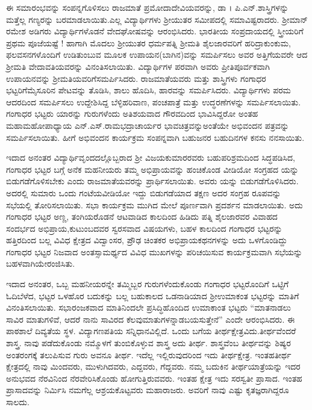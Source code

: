 {ಈ ಸಮಾರಂಭವನ್ನು ಸಂಪನ್ನಗೊಳಿಸಲು ರಾಜಮಾತೆ ಪ್ರಮೋದಾದೇವಿಯವ\-ರನ್ನು, ಡಾ । ಪಿ.ಎನ್.ಶಾಸ್ತ್ರಿಗಳನ್ನು ಮತ್ತೆಲ್ಲ ಗಣ್ಯರನ್ನು ಬರಮಾಡಲಾಯಿತು.ಎಲ್ಲ ವಿದ್ಯಾರ್ಥಿಗಳು ಶ್ರೀಯುತರ ಸಮೀಪದಲ್ಲಿ ಸಮಾವಿಷ್ಟರಾದರು. ಶ್ರೀಮಾನ್ ರಮೇಶ ಅಡಿಗರು ವಿದ್ಯಾರ್ಥಿಗಳೊಡನೆ ವೇದಘೋಷವನ್ನು ಆರಂಭಿಸಿದರು. ಭಾರತೀಯ ಸಂಪ್ರದಾಯದಲ್ಲಿ ಸ್ತ್ರೀಯರಿಗೆ ಪ್ರಥಮ ಪೂಜೆಯಷ್ಟೆ ! ಹಾಗಾಗಿ ಮೊದಲು ಶ್ರೀಯುತರ ಧರ್ಮಪತ್ನಿ ಶ್ರೀಮತಿ ಶೈಲಜಾರವರಿಗೆ  ಹರಿದ್ರಾಕುಂಕುಮ, ಫಲವಸನಗಳೊಂದಿಗೆ ಉಡಿತುಂಬುವ ಮೂಲಕ ಉಪಾಯನ(ಬಾಗಿನ)ವನ್ನು ಸಮರ್ಪಿಸಲು ಅವರ ಅತ್ತಿಗೆಯವರೇ ಆದ  ಶ್ರೀಮತಿ ವೇದಾವತಿಯವರನ್ನು ವಿನಂತಿಸಲಾಯಿತು. ವಿದ್ಯಾರ್ಥಿಗಳ ಪರವಾಗಿ ಅವರು ಪ್ರೀತಿಪೂರ್ವಕವಾಗಿ ಉಪಾಯನವನ್ನು ಶ್ರೀಮತಿಯವರಿಗೆ\break ಸಮರ್ಪಿಸಿದರು. ರಾಜಮಾತೆಯವರು ಮತ್ತು ಶಾಸ್ತ್ರಿಗಳು ಗಂಗಾಧರ ಭಟ್ಟರಿಗೆ\break ಮೈಸೂರಿನ ಪೇಟವನ್ನು ತೊಡಿಸಿ, ಶಾಲು ಹೊದಿಸಿ, ಹಾರವನ್ನು \hbox{ಸಮರ್ಪಿಸಿದರು}. ವಿದ್ಯಾರ್ಥಿಗಳು ಪರಮ ಆದರದಿಂದ ಸಮರ್ಪಿಸಲು ಉದ್ದೇಶಿಸಿದ್ದ ಬೆಳ್ಳಿಹರಿವಾಣ, ಪಂಚಪಾತ್ರೆ ಮತ್ತು ಉದ್ಧರಣೆಗಳನ್ನು ಸಮರ್ಪಿಸಲಾಯಿತು. ಗಂಗಾಧರ ಭಟ್ಟರು ಯಾರನ್ನು ಗುರುಗಳೆಂದು ಅತಿಶಯವಾದ ಗೌರವದಿಂದ ಭಾವಿಸಿದ್ದರೋ ಅಂತಹ ಮಹಾಮಹೋಪಾಧ್ಯಾಯ ಎನ್.ಎಸ್.ರಾಮಭದ್ರಾಚಾರ್ಯರ ಭಾವಚಿತ್ರವನ್ನು\break ಅಂತೆಯೇ ಅಭಿವಂದನ ಪತ್ರವನ್ನು ಸಮರ್ಪಿಸಲಾಯಿತು. ಹೀಗೆ ಅಭಿವಂದನ ಕಾರ್ಯಕ್ರಮ ಸಂಪನ್ನವಾಗಿ ಬಹುಜನರ ಬಹುದಿನಗಳ  ಕನಸು ನನಸಾಯಿತು. 
\vskip 8pt

ಇದಾದ ಅನಂತರ ವಿದ್ಯಾರ್ಥಿವೃಂದದಲ್ಲೊಬ್ಬರಾದ ಶ್ರೀ ವಿಜಯಕುಮಾರರವರು ಬಹುಪರಿಶ್ರಮದಿಂದ ಸಿದ್ಧಪಡಿಸಿದ, ಗಂಗಾಧರ ಭಟ್ಟರ ಬಗ್ಗೆ ಅನೆಕ ಮಹನೀಯರು ತಮ್ಮ ಅಭಿಪ್ರಾಯವನ್ನು ಹಂಚಿಕೊಂಡ ವೀಡಿಯೋ ಸಂಗ್ರಹದ  ಯನ್ನು ಬಿಡುಗಡೆ\-ಗೊಳಿಸಬೇಕು ಎಂದು ರಾಜಮಾತೆಯವರನ್ನು ಪ್ರಾರ್ಥಿಸಲಾಯಿತು. ಅವರು  ಯನ್ನು ಬಿಡುಗಡೆಗೊಳಿಸಿದರು. ಅದರಲ್ಲಿ ಸುಮಾರು ಒಂದು ಗಂಟೆಯ\break ವೀಡಿಯೋ ಇದ್ದು ಬಿಡುಗಡೆಯಾದ ತಕ್ಷಣ ಅದರ ಸಂಗ್ರಹ ರೂಪವನ್ನು ಸಭೆಯಲ್ಲಿ ತೋರಿಸಲಾಯಿತು. ಸಭಾ ಕಾರ್ಯಕ್ರಮ ಮುಗಿದ ಮೇಲೆ ಪೂರ್ಣವಾಗಿ ಪ್ರದರ್ಶನ ಮಾಡಲಾಯಿತು. ಅದು ಗಂಗಾಧರ ಭಟ್ಟರ ಅಣ್ಣ, ತಂಗಿಯರೊಡನೆ ಆಟವಾಡಿದ ಕಾಲದಿಂದ ಹಿಡಿದು ಪತ್ನಿ \enginline{-} ಶೈಲಜಾರವರ ವಿವಾಹದ ಸಂದರ್ಭದ ಅಭಿಪ್ರಾಯ,\break ಕುಟುಂಬದವರ ಸ್ವರಸವಾದ ವಿಷಯಗಳು, ಬಹಳ ಕಾಲದಿಂದ ಗಂಗಾಧರ ಭಟ್ಟರನ್ನು ಹತ್ತಿರದಿಂದ ಬಲ್ಲ ವಿವಿಧ ಕ್ಷೇತ್ರದ ವಿದ್ವಾಂಸರ, ಪ್ರೌಢ ಚಿಂತಕರ ಅಭಿಪ್ರಾಯಕಥನ\-ಗಳನ್ನು ಅದು ಒಳಗೊಂಡಿದ್ದು ಗಂಗಾಧರ ಭಟ್ಟರ ನಿಜವಾದ ಅಂತಸ್ಸಾಮರ್ಥ್ಯದ ವಿವಿಧ ಮುಖಗಳನ್ನು ಪರಿಚಯಿಸುವ ಕಾರ್ಯಕ್ರಮವಾಗಿ ಸಭೆಯನ್ನು ಬಹಳವಾಗಿಯೇ\break  ರಂಜಿಸಿತು.

ಇದಾದ ಅನಂತರ, ಒಬ್ಬ ಮಹನೀಯರನ್ನೇ ತಮ್ಮಿಬ್ಬರ ಗುರುಗಳೆಂದು\-ಕೊಂಡು ಗಂಗಾಧರ ಭಟ್ಟರೊಂದಿಗೆ ಒಟ್ಟಿಗೆ ಓದಿ\enginline{-}ಬೆಳೆದ, ಭಟ್ಟರ ಒಳಹೊರ ಬದುಕನ್ನು ಬಲ್ಲ ಬಹುಕಾಲದ ಒಡನಾಡಿಯಾದ ಶ್ರೀಉಮಾಕಂತ ಭಟ್ಟರನ್ನು ಮಾತಿಗೆ ವಿನಂತಿಸ\-ಲಾಯಿತು. ಸಭಾರಂಜಕವಾದ ಮಾತಿನಿಂದಲೇ ಪ್ರಸಿದ್ಧಿಹೊಂದಿದ ಉಮಾಕಾಂತ ಭಟ್ಟರು “ಮಾತನಾಡಲು ಸಾವಿರ ಮಾತುಗಳಿವೆ, ಆದರೆ ನಾನು ಸಾವಿರದ ಕೆಲವು\break ಮಾತುಗಳನ್ನಾಡಬಯಸುತ್ತೇನೆ” ಎಂದೇ ಆರಂಭಿಸಿದರು. ಈ ಪಾಠಶಾಲೆ ದಿವ್ಯತೆಯ ಸ್ಥಳ. ವಿದ್ಯಾಗಣಪತಿಯ ಸನ್ನಿಧಾನವಿಲ್ಲಿದೆ. ಒಂದು ಬಗೆಯ ತೀರ್ಥಕ್ಷೇತ್ರವಿದು.\break ತೀರ್ಥವೆಂದರೆ ಶಾಸ್ತ್ರ. ನಾವು ಪಡೆದುಕೊಂಡು ನಮ್ಮೊಳಗೆ ತುಂಬಿಕೊಳ್ಳುವ ಶಾಸ್ತ್ರ \enginline{-} ಅದು ತೀರ್ಥ. ಶಾಸ್ತ್ರವೆಂಬ ತೀರ್ಥವನ್ನು ಶಿಷ್ಯರ ಅಂತರಂಗಕ್ಕೆ ತಲುಪಿಸುವ ಗುರು \enginline{-} ಅವನೂ ತೀರ್ಥ. ಇದೆಲ್ಲ ಇಲ್ಲಿರುವುದರಿಂದ ಇದು ತೀರ್ಥಕ್ಷೇತ್ರ. ಇಂತಹ\break ತೀರ್ಥ ಕ್ಷೇತ್ರದಲ್ಲಿ ನಾವು ಮಿಂದವರು, ಮುಳುಗಿದವರು, ಎದ್ದವರು, ಗೆದ್ದವರು. ನಮ್ಮ ಬದುಕಿನ ತೀರ್ಥ\-ಯಾತ್ರೆಯನ್ನು ಇದರ ಅನುಭವದ ನೆರವಿನಿಂದ ನೆರವೇರಿಸಿಕೊಂಡು ಹೋಗುತ್ತಿರು\-ವವರು. ಇಂತಹ ಕ್ಷೇತ್ರ \enginline{-}  ಇದು ಸರಸ್ವತೀ ಪ್ರಾಸಾದ. ಇಂತಹ ಪ್ರಾಸಾದವನ್ನು ನಿರ್ಮಿಸಿ ನಮಗೆಲ್ಲ ಆಶ್ರಯಕೊಟ್ಟವರು ಮಹಾರಾಜರು. ಅವರಿಗೆ ನಾವು ಎಷ್ಟು ಕೃತಜ್ಞ\-ರಾಗಿದ್ದರೂ ಸಾಲದು.

}
